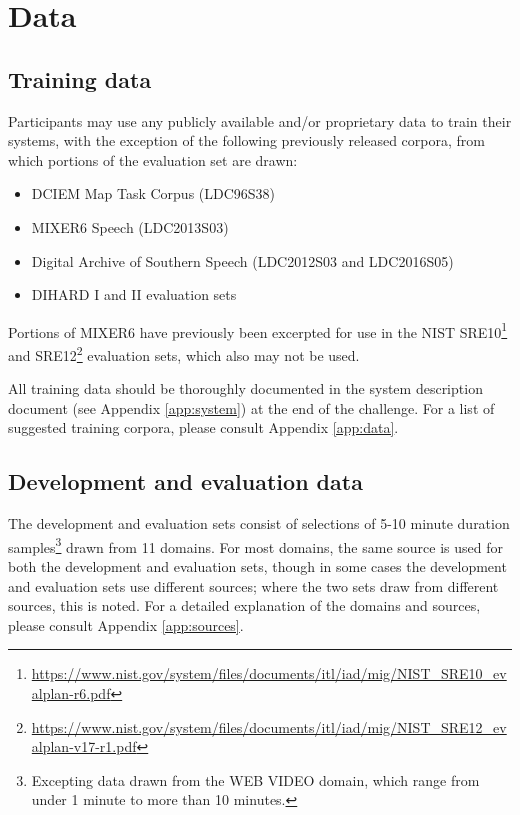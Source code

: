 \documentclass{article}
\begin{document}
\section{Data}
\label{sec:data}
\subsection{Training data}
\label{sec:data:train}
Participants may use any publicly available and/or proprietary data to train their systems, with the exception of the following previously released corpora, from which portions of the evaluation set are drawn:
\begin{itemize}
    \item DCIEM Map Task Corpus (LDC96S38)
    \item MIXER6 Speech (LDC2013S03)
    \item Digital Archive of Southern Speech (LDC2012S03 and LDC2016S05)
    \item DIHARD I and II evaluation sets
\end{itemize}
Portions of MIXER6 have previously been excerpted for use in the NIST SRE10\footnote{\url{https://www.nist.gov/system/files/documents/itl/iad/mig/NIST_SRE10_evalplan-r6.pdf}} and SRE12\footnote{\url{https://www.nist.gov/system/files/documents/itl/iad/mig/NIST_SRE12_evalplan-v17-r1.pdf}} evaluation sets, which also may not be used.

All training data should be thoroughly documented in the system description document (see Appendix \ref{app:system}) at the end of the challenge. For a list of suggested training corpora, please consult Appendix \ref{app:data}. 


\subsection{Development and evaluation data}
\label{sec:singlechannel}
The development and evaluation sets consist of  selections of 5-10 minute duration samples\footnote{Excepting data drawn from the WEB VIDEO domain, which range from under 1 minute to more than 10 minutes.} drawn from 11 domains. For most domains, the same source is used for both the development and evaluation sets, though in some cases the development and evaluation sets use different sources; where the two sets draw from different sources, this is noted. For a detailed explanation of the domains and sources, please consult Appendix \ref{app:sources}.
\end{document}
